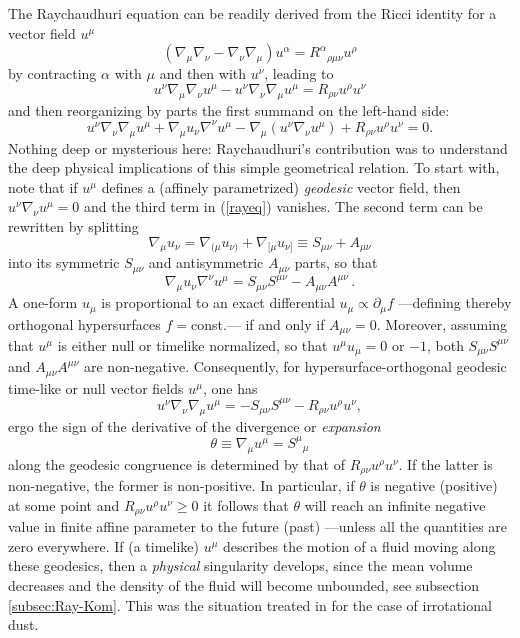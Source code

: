 \documentclass[12pt]{iopart}
\def\be{\begin{equation}}
\def\ee{\end{equation}}
\begin{document}
The Raychaudhuri equation can be readily derived from the Ricci identity for a vector field $u^\mu$
$$
(\nabla_{\mu}\nabla_{\nu}-\nabla_{\nu}\nabla_{\mu})u^{\alpha}=
R^{\alpha}{}_{\rho\mu\nu}u^{\rho}
$$
by contracting $\alpha$ with $\mu$ and then with $u^{\nu}$, leading to
$$
u^{\nu}\nabla_{\mu}\nabla_{\nu}u^{\mu}-u^{\nu}\nabla_{\nu}\nabla_{\mu}u^{\mu}=
R_{\rho\nu}u^{\rho}u^{\nu}
$$
and then reorganizing by parts the 
first summand on the left-hand side:
\begin{equation}
u^{\nu}\nabla_{\nu}\nabla_{\mu}u^{\mu}+\nabla_{\mu}u_{\nu}\nabla^{\nu}u^{\mu}-
\nabla_{\mu}(u^{\nu}\nabla_{\nu}u^{\mu})+R_{\rho\nu}u^{\rho}u^{\nu}=0.
\label{rayeq}
\end{equation}
Nothing deep or mysterious here: Raychaudhuri's
contribution was to understand the deep
physical implications of this simple geometrical relation. 
To start with, note that if $u^\mu$ defines a 
(affinely parametrized) {\em geodesic} vector field, then 
$u^{\nu}\nabla_{\nu}u^{\mu}=0$ and the third term in (\ref{rayeq}) vanishes. The 
second term can be rewritten by splitting 
$$
\nabla_{\mu}u_{\nu}=\nabla_{(\mu}u_{\nu)}+\nabla_{[\mu}u_{\nu]}\equiv S_{\mu\nu}+A_{\mu\nu}
$$
into its symmetric $S_{\mu\nu}$ and antisymmetric $A_{\mu\nu}$ parts, 
so that
$$
\nabla_{\mu}u_{\nu}\nabla^{\nu}u^{\mu}=S_{\mu\nu}S^{\mu\nu}-A_{\mu\nu}A^{\mu\nu}\, .
$$
A one-form $u_{\mu}$ is proportional to an exact differential $u_\mu \propto \partial_\mu f$ ---defining thereby  orthogonal 
hypersurfaces $f=$const.--- if and only if $A_{\mu\nu}=0$. Moreover,
assuming that $u^{\mu}$ is either null or timelike normalized, so that $u^\mu u_\mu =0$ or $-1$, both $S_{\mu\nu}S^{\mu\nu}$ and $A_{\mu\nu}A^{\mu\nu}$ are non-negative.  Consequently, for 
hypersurface-orthogonal geodesic time-like or null vector fields 
$u^{\mu}$, one has
$$
u^{\nu}\nabla_{\nu}\nabla_{\mu}u^{\mu}=
-S_{\mu\nu}S^{\mu\nu}-R_{\rho\nu}u^{\rho}u^{\nu},
$$
ergo the sign of the derivative of the divergence or {\em expansion}
\be
\theta\equiv \nabla_{\mu}u^{\mu}=S^{\mu}{}_{\mu} \label{theta}
\ee
along the geodesic congruence
is determined by that 
of $R_{\rho\nu}u^{\rho}u^{\nu}$. If the latter is non-negative, 
the former is non-positive. In particular, if $\theta$ is 
negative (positive) at some point and $R_{\rho\nu}u^{\rho}u^{\nu}\geq 0$ it follows that $\theta$ will reach an infinite negative value in finite affine parameter to the future (past) ---unless all the quantities are zero 
everywhere. If (a timelike)  $u^\mu$ describes the motion of a fluid moving along these geodesics, then 
a {\em physical} singularity develops, since the mean volume 
decreases and the density of the fluid will become unbounded, see subsection \ref{subsec:Ray-Kom}. This was  
the situation treated in \cite{Ray} for the case of irrotational 
dust. 
\end{document}
